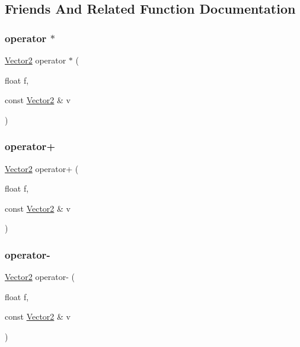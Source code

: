 \subsection{Friends And Related Function Documentation}
\mbox{\label{class_vector2_aa5c3661af046ba224635fbf77729de94}} 
\subsubsection{\texorpdfstring{operator $\ast$}{operator *}}
{\footnotesize\ttfamily \mbox{\hyperlink{class_vector2}{Vector2}} operator $\ast$ (\begin{DoxyParamCaption}\item[{float}]{f,  }\item[{const \mbox{\hyperlink{class_vector2}{Vector2}} \&}]{v }\end{DoxyParamCaption})\hspace{0.3cm}{\ttfamily [friend]}}

\mbox{\label{class_vector2_acdcdfd84e8ee80fe70a824afb0fd344c}} 
\subsubsection{\texorpdfstring{operator+}{operator+}}
{\footnotesize\ttfamily \mbox{\hyperlink{class_vector2}{Vector2}} operator+ (\begin{DoxyParamCaption}\item[{float}]{f,  }\item[{const \mbox{\hyperlink{class_vector2}{Vector2}} \&}]{v }\end{DoxyParamCaption})\hspace{0.3cm}{\ttfamily [friend]}}

\mbox{\label{class_vector2_a79610326926ae4fa745d033364da066b}} 
\subsubsection{\texorpdfstring{operator-\/}{operator-}}
{\footnotesize\ttfamily \mbox{\hyperlink{class_vector2}{Vector2}} operator-\/ (\begin{DoxyParamCaption}\item[{float}]{f,  }\item[{const \mbox{\hyperlink{class_vector2}{Vector2}} \&}]{v }\end{DoxyParamCaption})\hspace{0.3cm}{\ttfamily [friend]}}

